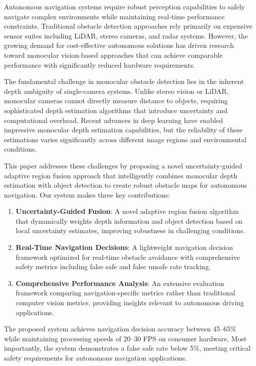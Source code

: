 \documentclass[12pt,oneside]{book}
\begin{document}
Autonomous navigation systems require robust perception capabilities to safely navigate complex environments while maintaining real-time performance constraints. Traditional obstacle detection approaches rely primarily on expensive sensor suites including LiDAR, stereo cameras, and radar systems. However, the growing demand for cost-effective autonomous solutions has driven research toward monocular vision-based approaches that can achieve comparable performance with significantly reduced hardware requirements.

The fundamental challenge in monocular obstacle detection lies in the inherent depth ambiguity of single-camera systems. Unlike stereo vision or LiDAR, monocular cameras cannot directly measure distance to objects, requiring sophisticated depth estimation algorithms that introduce uncertainty and computational overhead. Recent advances in deep learning have enabled impressive monocular depth estimation capabilities, but the reliability of these estimations varies significantly across different image regions and environmental conditions.

This paper addresses these challenges by proposing a novel uncertainty-guided adaptive region fusion approach that intelligently combines monocular depth estimation with object detection to create robust obstacle maps for autonomous navigation. Our system makes three key contributions:

\begin{enumerate}
\item \textbf{Uncertainty-Guided Fusion}: A novel adaptive region fusion algorithm that dynamically weights depth information and object detection based on local uncertainty estimates, improving robustness in challenging conditions.

\item \textbf{Real-Time Navigation Decisions}: A lightweight navigation decision framework optimized for real-time obstacle avoidance with comprehensive safety metrics including false safe and false unsafe rate tracking.

\item \textbf{Comprehensive Performance Analysis}: An extensive evaluation framework comparing navigation-specific metrics rather than traditional computer vision metrics, providing insights relevant to autonomous driving applications.
\end{enumerate}

The proposed system achieves navigation decision accuracy between 45--65\% while maintaining processing speeds of 20--30 FPS on consumer hardware. Most importantly, the system demonstrates a false safe rate below 5\%, meeting critical safety requirements for autonomous navigation applications.
\end{document}
